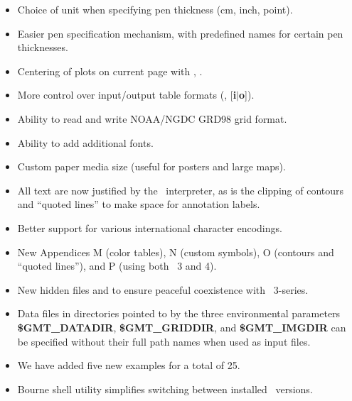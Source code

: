 \begin{description}
\begin{itemize}
\item Choice of unit when specifying pen thickness (cm, inch, point).
\item Easier pen specification mechanism, with predefined names for certain pen thicknesses.
\item Centering of plots on current page with , .
\item More control over input/output table formats (, \Opt{:}[{\bf i$|$o}]).
\item Ability to read and write NOAA/NGDC GRD98 grid format.
\item Ability to add additional fonts.
\item Custom paper media size (useful for posters and large maps).
\item All text are now justified by the \PS\ interpreter, as is the clipping of contours and ``quoted lines''
to make space for annotation labels.
\item Better support for various international character encodings.
\item New Appendices M (color tables), N (custom symbols), O (contours and ``quoted lines''), and P
(using both \GMT\ 3 and 4).
\item New hidden files  and  to ensure peaceful coexistence with \GMT\ 3-series.
\item Data files in directories pointed to by the three environmental parameters {\bf \$GMT\_DATADIR}, {\bf \$GMT\_GRIDDIR},
and {\bf \$GMT\_IMGDIR} can be specified without their full path names when used as input files.
\item We have added five new examples for a total of 25.
\item Bourne shell utility  simplifies switching between installed \GMT\ versions.
\end{itemize}
\end{description}

